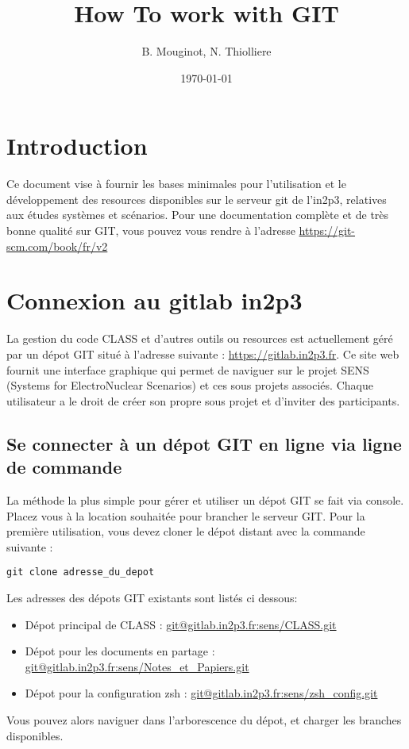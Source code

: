\documentclass[a4paper,11pt]{article}
\title{How To work with GIT}
\date{\today}
\author{B. Mouginot, N. Thiolliere}
\begin{document}
\maketitle
{}

\tableofcontents

\section{Introduction}

	Ce document vise à fournir les bases minimales pour l'utilisation et le développement des resources disponibles sur le serveur git de l'in2p3, relatives aux études systèmes et scénarios. Pour une documentation complète et de très bonne qualité sur GIT, vous pouvez vous rendre à l'adresse \url{https://git-scm.com/book/fr/v2}

\section{Connexion au gitlab in2p3}

	La gestion du code CLASS et d'autres outils ou resources est actuellement géré par un dépot GIT situé à l'adresse suivante : \url{https://gitlab.in2p3.fr}. Ce site web fournit une interface graphique qui permet de naviguer sur le projet SENS (Systems for ElectroNuclear Scenarios) et ces sous projets associés. Chaque utilisateur a le droit de créer son propre sous projet et d'inviter des participants. 

	\subsection{Se connecter à un dépot GIT en ligne via ligne de commande}

	La méthode la plus simple pour gérer et utiliser un dépot GIT se fait via console. Placez vous à la location souhaitée pour brancher le serveur GIT. Pour la première utilisation, vous devez cloner le dépot distant avec la commande suivante :
	\bigskip

	\begin{lstlisting}[style=BashInputStyle]
	git clone adresse_du_depot
	\end{lstlisting}

	Les adresses des dépots GIT existants sont listés ci dessous:
	\bigskip

	\begin{itemize}
		\item Dépot principal de CLASS : \url{git@gitlab.in2p3.fr:sens/CLASS.git}
		\item Dépot pour les documents en partage : \url{git@gitlab.in2p3.fr:sens/Notes_et_Papiers.git}
		\item Dépot pour la configuration zsh : \url{git@gitlab.in2p3.fr:sens/zsh_config.git}
	\end{itemize}
	\bigskip
	Vous pouvez alors naviguer dans l'arborescence du dépot, et charger les branches disponibles. 
\end{document}
